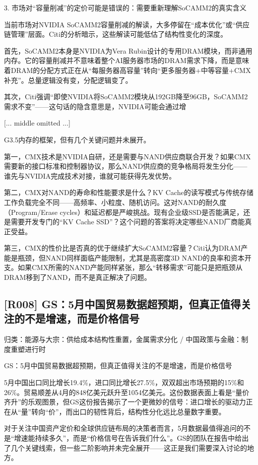 \documentclass[11pt]{ctexart}
\begin{document}
3. 市场对“容量削减”的定价可能是错误的：需要重新理解SoCAMM2的真实含义

当前市场对NVIDIA SoCAMM2容量削减的解读，大多停留在“成本优化”或“供应链管理”层面。Citi的分析暗示，这些解读可能低估了结构性变化的深度。

首先，SoCAMM2本身是NVIDIA为Vera Rubin设计的专用DRAM模块，而非通用内存。它的容量削减并不意味着整个AI服务器市场的DRAM需求下降，而是意味着DRAM的分配方式正在从“每服务器高容量”转向“更多服务器+中等容量+CMX补充”。总量逻辑没有变，分配逻辑变了。

其次，Citi强调“即使NVIDIA将SoCAMM2模块从192GB降至96GB，SoCAMM2需求不变”——这句话的隐含意思是，NVIDIA可能会通过增

[... middle omitted ...]

G3.5内存的框架，但有几个关键问题并未展开。

第一，CMX技术是NVIDIA自研，还是需要与NAND供应商联合开发？如果CMX需要新的接口标准和控制器协议，那么NAND供应商的竞争格局将发生分化——谁先与NVIDIA完成技术对接，谁就可能获得先发优势。

第二，CMX对NAND的寿命和性能要求是什么？KV Cache的读写模式与传统存储工作负载完全不同——高频率、小粒度、随机访问。这对NAND的耐久度（Program/Erase cycles）和延迟都是严峻挑战。现有企业级SSD是否能满足，还是需要开发专门的“KV Cache SSD”？这个问题的答案将决定哪些NAND厂商能真正受益。

第三，CMX的性价比是否真的优于继续扩大SoCAMM2容量？Citi认为DRAM产能是瓶颈，但NAND同样面临产能限制，尤其是高密度3D NAND的良率和资本开支。如果CMX所需的NAND产能同样紧张，那么“转移需求”可能只是把瓶颈从DRAM移到了NAND，而不是真正解决了问题。

\subsection{[R008] GS：5月中国贸易数据超预期，但真正值得关注的不是增速，而是价格信号}
{\small\color{refgray}归类：能源与大宗：供给成本结构性重置，金属需求分化 / 中国政策与金融：制度重塑进行时}

GS：5月中国贸易数据超预期，但真正值得关注的不是增速，而是价格信号

5月中国出口同比增长19.4\%，进口同比增长27.5\%，双双超出市场预期的15\%和26\%。贸易顺差从4月的848亿美元跃升至1054亿美元。这份数据表面上看是“量价齐升”的乐观图景，但GS这份报告揭示了一个更微妙的信号：进口增长的驱动力正在从“量”转向“价”，而出口的韧性背后，结构性分化远比总量数字重要。

对于关注中国资产定价和全球供应链布局的决策者而言，5月数据最值得追问的不是“增速能持续多久”，而是“价格信号在告诉我们什么”。GS的团队在报告中给出了几个关键线索，但一些二阶影响并未完全展开——这正是我们需要深入讨论的地方。
\end{document}

